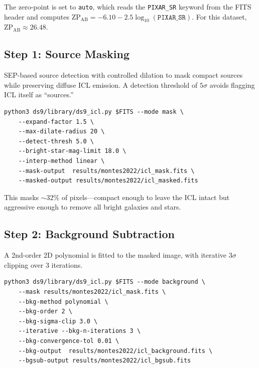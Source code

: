 \documentclass[11pt,fleqn]{book}
\begin{document}
\begin{remark}
The zero-point is set to \texttt{auto}, which reads the \texttt{PIXAR\_SR}
keyword from the FITS header and computes
$\mathrm{ZP_{AB}} = -6.10 - 2.5\log_{10}(\texttt{PIXAR\_SR})$.
For this dataset, $\mathrm{ZP_{AB}} \approx 26.48$.
\end{remark}

\subsection{Step 1: Source Masking}

SEP-based source detection with controlled dilation to mask compact sources
while preserving diffuse ICL emission.
A detection threshold of $5\sigma$ avoids flagging ICL itself as ``sources.''

\begin{codebox}
\begin{lstlisting}[style=bash,numbers=none]
python3 ds9/library/ds9_icl.py $FITS --mode mask \
    --expand-factor 1.5 \
    --max-dilate-radius 20 \
    --detect-thresh 5.0 \
    --bright-star-mag-limit 18.0 \
    --interp-method linear \
    --mask-output  results/montes2022/icl_mask.fits \
    --masked-output results/montes2022/icl_masked.fits
\end{lstlisting}
\end{codebox}

\noindent
This masks ${\sim}32\%$ of pixels---compact enough to leave the ICL intact
but aggressive enough to remove all bright galaxies and stars.

\subsection{Step 2: Background Subtraction}

A 2nd-order 2D polynomial is fitted to the masked image, with iterative
$3\sigma$ clipping over 3 iterations.

\begin{codebox}[Step 2: 2D Polynomial Background]
\begin{lstlisting}[style=bash,numbers=none]
python3 ds9/library/ds9_icl.py $FITS --mode background \
    --mask results/montes2022/icl_mask.fits \
    --bkg-method polynomial \
    --bkg-order 2 \
    --bkg-sigma-clip 3.0 \
    --iterative --bkg-n-iterations 3 \
    --bkg-convergence-tol 0.01 \
    --bkg-output  results/montes2022/icl_background.fits \
    --bgsub-output results/montes2022/icl_bgsub.fits
\end{lstlisting}
\end{codebox}
\end{document}
